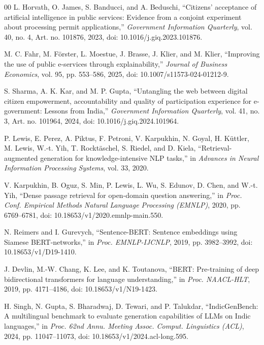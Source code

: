 \documentclass[conference]{IEEEtran}
\begin{document}
\begin{thebibliography}{00}
L. Horvath, O. James, S. Banducci, and A. Beduschi, ``Citizens' acceptance of artificial intelligence in public services: Evidence from a conjoint experiment about processing permit applications,'' \textit{Government Information Quarterly}, vol. 40, no. 4, Art. no. 101876, 2023, doi: 10.1016/j.giq.2023.101876.

M. C. Fahr, M. Förster, L. Moestue, J. Brasse, J. Klier, and M. Klier, ``Improving the use of public e-services through explainability,'' \textit{Journal of Business Economics}, vol. 95, pp. 553--586, 2025, doi: 10.1007/s11573-024-01212-9.

S. Sharma, A. K. Kar, and M. P. Gupta, ``Untangling the web between digital citizen empowerment, accountability and quality of participation experience for e-government: Lessons from India,'' \textit{Government Information Quarterly}, vol. 41, no. 3, Art. no. 101964, 2024, doi: 10.1016/j.giq.2024.101964.

P. Lewis, E. Perez, A. Piktus, F. Petroni, V. Karpukhin, N. Goyal, H. Küttler, M. Lewis, W.-t. Yih, T. Rocktäschel, S. Riedel, and D. Kiela, ``Retrieval-augmented generation for knowledge-intensive NLP tasks,'' in \textit{Advances in Neural Information Processing Systems}, vol. 33, 2020.

V. Karpukhin, B. Oguz, S. Min, P. Lewis, L. Wu, S. Edunov, D. Chen, and W.-t. Yih, ``Dense passage retrieval for open-domain question answering,'' in \textit{Proc. Conf. Empirical Methods Natural Language Processing (EMNLP)}, 2020, pp. 6769--6781, doi: 10.18653/v1/2020.emnlp-main.550.

N. Reimers and I. Gurevych, ``Sentence-BERT: Sentence embeddings using Siamese BERT-networks,'' in \textit{Proc. EMNLP-IJCNLP}, 2019, pp. 3982--3992, doi: 10.18653/v1/D19-1410.

J. Devlin, M.-W. Chang, K. Lee, and K. Toutanova, ``BERT: Pre-training of deep bidirectional transformers for language understanding,'' in \textit{Proc. NAACL-HLT}, 2019, pp. 4171--4186, doi: 10.18653/v1/N19-1423.

H. Singh, N. Gupta, S. Bharadwaj, D. Tewari, and P. Talukdar, ``IndicGenBench: A multilingual benchmark to evaluate generation capabilities of LLMs on Indic languages,'' in \textit{Proc. 62nd Annu. Meeting Assoc. Comput. Linguistics (ACL)}, 2024, pp. 11047--11073, doi: 10.18653/v1/2024.acl-long.595.


\end{thebibliography}
\end{document}
